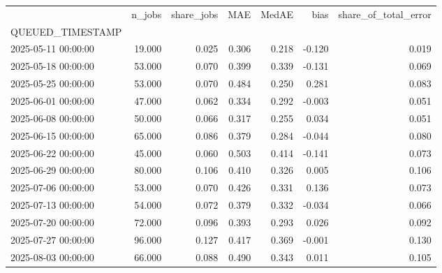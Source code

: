 \begin{tabular}{lrrrrrr}
\toprule
 & n_jobs & share_jobs & MAE & MedAE & bias & share_of_total_error \\
QUEUED_TIMESTAMP &  &  &  &  &  &  \\
\midrule
2025-05-11 00:00:00 & 19.000 & 0.025 & 0.306 & 0.218 & -0.120 & 0.019 \\
2025-05-18 00:00:00 & 53.000 & 0.070 & 0.399 & 0.339 & -0.131 & 0.069 \\
2025-05-25 00:00:00 & 53.000 & 0.070 & 0.484 & 0.250 & 0.281 & 0.083 \\
2025-06-01 00:00:00 & 47.000 & 0.062 & 0.334 & 0.292 & -0.003 & 0.051 \\
2025-06-08 00:00:00 & 50.000 & 0.066 & 0.317 & 0.255 & 0.034 & 0.051 \\
2025-06-15 00:00:00 & 65.000 & 0.086 & 0.379 & 0.284 & -0.044 & 0.080 \\
2025-06-22 00:00:00 & 45.000 & 0.060 & 0.503 & 0.414 & -0.141 & 0.073 \\
2025-06-29 00:00:00 & 80.000 & 0.106 & 0.410 & 0.326 & 0.005 & 0.106 \\
2025-07-06 00:00:00 & 53.000 & 0.070 & 0.426 & 0.331 & 0.136 & 0.073 \\
2025-07-13 00:00:00 & 54.000 & 0.072 & 0.379 & 0.332 & -0.034 & 0.066 \\
2025-07-20 00:00:00 & 72.000 & 0.096 & 0.393 & 0.293 & 0.026 & 0.092 \\
2025-07-27 00:00:00 & 96.000 & 0.127 & 0.417 & 0.369 & -0.001 & 0.130 \\
2025-08-03 00:00:00 & 66.000 & 0.088 & 0.490 & 0.343 & 0.011 & 0.105 \\
\bottomrule
\end{tabular}
